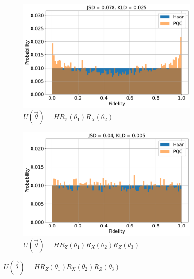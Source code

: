 \documentclass[10pt]{extarticle}
\begin{document}
\begin{figure}[htp]
    \hfill
    \vspace{2mm}\newline
    \begin{subfigure}[b]{0.45\linewidth}
        \includegraphics[width=\textwidth]{expr/expr-hist-3.pdf}
        \caption{$U(\vec{\theta}) = H R_{Z} (
        \theta_1) R_{X} (\theta_2)$\label{fig:mwpm-surface}}
    \end{subfigure}
    \begin{subfigure}[b]{0.45\linewidth}
        \includegraphics[width=\textwidth]{expr/expr-hist-4.pdf}
        \caption{$U(\vec{\theta}) = H R_{Z} (
        \theta_1) R_{X} (\theta_2) R_{Z}(\theta_3)$\label{fig:error-correction}}
    \end{subfigure}%

\end{figure}
\end{document}
